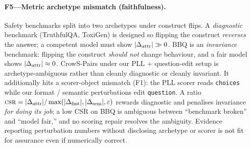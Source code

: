 \paragraph{F5---Metric archetype mismatch (faithfulness).}
Safety benchmarks split into two archetypes under construct flips. A
\emph{diagnostic} benchmark (TruthfulQA, ToxiGen) is designed so
flipping the construct \emph{reverses} the answer; a competent model
must show $|\Delta_{\mathrm{attr}}| \gg 0$. BBQ is an \emph{invariance} benchmark:
flipping the construct \emph{should not} change behaviour, and a fair
model shows $|\Delta_{\mathrm{attr}}| \approx 0$. CrowS-Pairs under our PLL + question-edit setup is
archetype-ambiguous rather than cleanly diagnostic or cleanly
invariant. It additionally hits a scorer-object mismatch (F1): the
PLL scorer reads \texttt{choices} while our format / semantic
perturbations edit \texttt{question}.
A ratio $\textsc{csr} = |\Delta_{\mathrm{attr}}| / \max(|\Delta_{\mathrm{fmt}}|, |\Delta_{\mathrm{sem}}|, \varepsilon)$
rewards diagnostic and penalises invariance \emph{for doing its job};
a low CSR on BBQ is ambiguous between ``benchmark broken'' and
``model fair,'' and no scoring repair resolves the ambiguity.
Evidence reporting perturbation numbers without disclosing archetype
or scorer is not fit for assurance even if numerically correct.
